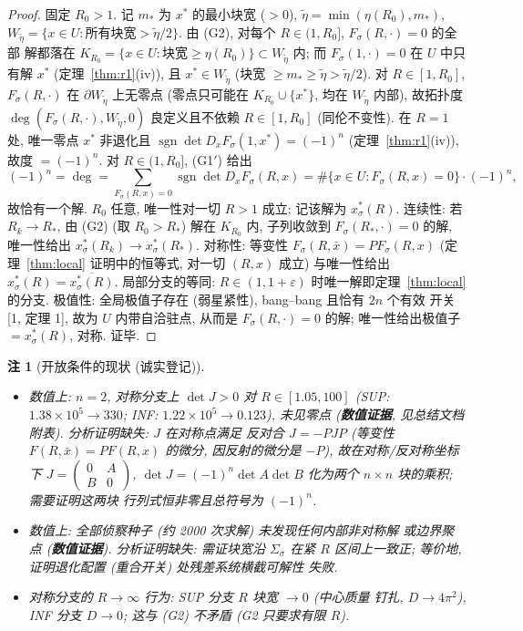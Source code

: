\documentclass[UTF8]{ctexart}
\newtheorem{remark}[theorem]{注}
\newcommand{\EVIDENCE}{\textbf{数值证据}}
\begin{document}
\begin{proof}
固定 $R_0>1$. 记 $m_*$ 为 $x^*$ 的最小块宽 ($>0$),
$\tilde\eta=\min(\eta(R_0),m_*)$, $W_{\tilde\eta}=\{x\in U: \text{所有块宽}
>\tilde\eta/2\}$. 由 (G2), 对每个 $R\in(1,R_0]$, $F_\sigma(R,\cdot)=0$ 的全部
解都落在 $K_{R_0}=\{x\in U: \text{块宽}\ge\eta(R_0)\}\subset W_{\tilde\eta}$ 内;
而 $F_\sigma(1,\cdot)=0$ 在 $U$ 中只有解 $x^*$ (定理~\ref{thm:r1}(iv)), 且
$x^*\in W_{\tilde\eta}$ (块宽 $\ge m_*\ge\tilde\eta>\tilde\eta/2$). 对
$R\in[1,R_0]$, $F_\sigma(R,\cdot)$ 在 $\partial W_{\tilde\eta}$ 上无零点
(零点只可能在 $K_{R_0}\cup\{x^*\}$, 均在 $W_{\tilde\eta}$ 内部), 故拓扑度
$\deg(F_\sigma(R,\cdot),W_{\tilde\eta},0)$ 良定义且不依赖 $R\in[1,R_0]$
(同伦不变性). 在 $R=1$ 处, 唯一零点 $x^*$ 非退化且
$\operatorname{sgn}\det D_xF_\sigma(1,x^*)=(-1)^n$
(定理~\ref{thm:r1}(iv)), 故度 $=(-1)^n$. 对 $R\in(1,R_0]$, (G1$'$) 给出
\begin{equation*}
	(-1)^n=\deg
	=\sum_{F_\sigma(R,x)=0}\operatorname{sgn}\det D_xF_\sigma(R,x)
	=\#\{x\in U: F_\sigma(R,x)=0\}\cdot(-1)^n,
\end{equation*}
故恰有一个解. $R_0$ 任意, 唯一性对一切 $R>1$ 成立; 记该解为
$x_\sigma^*(R)$. 连续性: 若 $R_k\to R_*$, 由 (G2) (取 $R_0>R_*$) 解在
$K_{R_0}$ 内, 子列收敛到 $F_\sigma(R_*,\cdot)=0$ 的解, 唯一性给出
$x_\sigma^*(R_k)\to x_\sigma^*(R_*)$. 对称性: 等变性
$F_\sigma(R,\bar x)=PF_\sigma(R,x)$ (定理~\ref{thm:local} 证明中的恒等式,
对一切 $(R,x)$ 成立) 与唯一性给出 $x_\sigma^*(R)=\overline{x_\sigma^*(R)}$.
局部分支的等同: $R\in(1,1+\varepsilon)$ 时唯一解即定理~\ref{thm:local}
的分支. 极值性: 全局极值子存在 (弱星紧性), bang--bang 且恰有 $2n$ 个有效
开关 [1, 定理 1], 故为 $U$ 内带自洽驻点, 从而是 $F_\sigma(R,\cdot)=0$ 的解;
唯一性给出极值子 $=x_\sigma^*(R)$, 对称. 证毕.
\end{proof}

\begin{remark}[开放条件的现状 (诚实登记)]
\begin{itemize}
	\item[(G1$'$)] 数值上: $n=2$, 对称分支上 $\det J>0$ 对
	$R\in[1.05,100]$ (SUP: $1.38\times10^5\to330$; INF: $1.22\times10^5\to0.123$),
	未见零点 (\EVIDENCE, 见总结文档附表). 分析证明缺失: $J$ 在对称点满足
	反对合 $J=-PJP$ (等变性 $F(R,\bar x)=PF(R,x)$ 的微分, 因反射的微分是
	$-P$), 故在对称/反对称坐标下 $J=\begin{pmatrix}0&A\\B&0\end{pmatrix}$,
	$\det J=(-1)^n\det A\det B$ 化为两个 $n\times n$ 块的乘积; 需要证明这两块
	行列式恒非零且总符号为 $(-1)^n$.
	\item[(G2)] 数值上: 全部侦察种子 (约 2000 次求解) 未发现任何内部非对称解
	或边界聚点 (\EVIDENCE). 分析证明缺失: 需证块宽沿 $\Sigma_\sigma$ 在紧
	$R$ 区间上一致正; 等价地, 证明退化配置 (重合开关) 处残差系统横截可解性
	失败.
	\item 对称分支的 $R\to\infty$ 行为: SUP 分支 $R$ 块宽 $\to0$ (中心质量
	钉扎, $D\to4\pi^2$), INF 分支 $D\to0$; 这与 (G2) 不矛盾 (G2 只要求有限
	$R$).
\end{itemize}
\end{remark}
\end{document}
